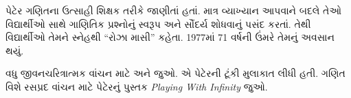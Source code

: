 \documentclass[../../../include/open-logic-section]{subfiles}
\begin{document}
પેટેર ગણિતના ઉત્સાહી
શિક્ષક તરીકે જાણીતાં હતાં.
માત્ર વ્યાખ્યાન આપવાને
બદલે તેઓ વિદ્યાર્થીઓ
સાથે ગાણિતિક પ્રશ્નોનું
સ્વરૂપ અને સૌંદર્ય શોધવાનું
પસંદ કરતાં. તેથી વિદ્યાર્થીઓ
તેમને સ્નેહથી “રોઝા માસી”
કહેતા. 1977માં 71 વર્ષની
ઉંમરે તેમનું અવસાન થયું.


\begin{reading}
વધુ જીવનચરિત્રાત્મક વાંચન માટે
\citep{Oconnor2014} અને
\citep{Andrasfai1986} જુઓ.
\citet{Tamassy1994}એ પેટેરની
ટૂંકી મુલાકાત લીધી હતી.
ગણિત વિશે રસપ્રદ વાંચન
માટે પેટેરનું પુસ્તક
\emph{Playing With Infinity}
\citep{Peter2010} જુઓ.
\end{reading}
\end{document}
